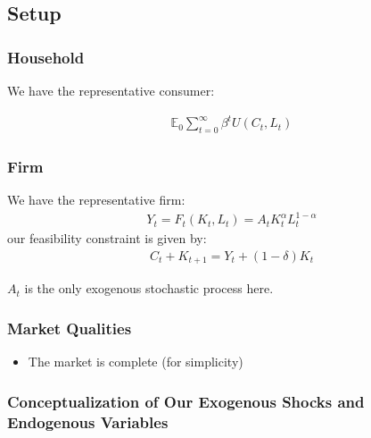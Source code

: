 \documentclass[10pt]{article}
\begin{document}

\subsection{Setup}

\subsubsection{Household}

We have the representative consumer:

\begin{align}
    \mathbb{E}_0 \sum_{t=0}^{\infty} \beta^t U\left(C_t, L_t\right)
\end{align}




\subsubsection{Firm}

We have the representative firm:
\begin{align}
    Y_t=F_t\left(K_t, L_t\right)=A_t K_t^\alpha L_t^{1-\alpha}
\end{align}
our feasibility constraint is given by:
\begin{align}
    C_t+K_{t+1}=Y_t+(1-\delta) K_t
\end{align}

$A_t$ is the only exogenous stochastic process here.




\subsubsection{Market Qualities}

\begin{itemize}
    \item The market is complete (for simplicity)
\end{itemize}


\subsubsection{Conceptualization of Our Exogenous Shocks and Endogenous Variables}
\end{document}
